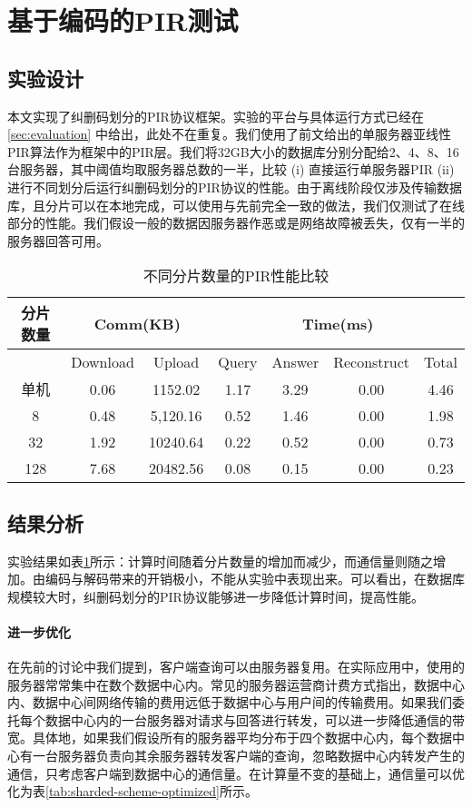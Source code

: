 \section{基于编码的PIR测试}
\subsection{实验设计}
本文实现了纠删码划分的PIR协议框架。实验的平台与具体运行方式已经在 \ref{sec:evaluation} 中给出，此处不在重复。我们使用了前文给出的单服务器亚线性PIR算法作为框架中的PIR层。我们将32GB大小的数据库分别分配给2、4、8、16台服务器，其中阈值均取服务器总数的一半，比较 (i) 直接运行单服务器PIR (ii) 进行不同划分后运行纠删码划分的PIR协议的性能。由于离线阶段仅涉及传输数据库，且分片可以在本地完成，可以使用与先前完全一致的做法，我们仅测试了在线部分的性能。我们假设一般的数据因服务器作恶或是网络故障被丢失，仅有一半的服务器回答可用。

\begin{table}[]
    \caption{不同分片数量的PIR性能比较}
    \label{tab:sharded-scheme}
    \centering
    \begin{tabular}{@{}c|cc|cccc@{}}
    \toprule
    分片数量 & \multicolumn{2}{c|}{Comm(KB)} & \multicolumn{4}{c}{Time(ms)}         \\ \midrule
         & Download      & Upload        & Query & Answer & Reconstruct & Total \\ \midrule
    单机   & 0.06          & 1152.02       & 1.17  & 3.29   & 0.00        & 4.46  \\
    8    & 0.48          & 5,120.16      & 0.52  & 1.46   & 0.00        & 1.98  \\
    32   & 1.92          & 10240.64      & 0.22  & 0.52   & 0.00        & 0.73  \\
    128  & 7.68          & 20482.56      & 0.08  & 0.15   & 0.00        & 0.23  \\ \bottomrule
    \end{tabular}
    \end{table}
\subsection{结果分析}

实验结果如表\ref{tab:sharded-scheme}所示：计算时间随着分片数量的增加而减少，而通信量则随之增加。由编码与解码带来的开销极小，不能从实验中表现出来。可以看出，在数据库规模较大时，纠删码划分的PIR协议能够进一步降低计算时间，提高性能。

\paragraph{进一步优化}
在先前的讨论中我们提到，客户端查询可以由服务器复用。在实际应用中，使用的服务器常常集中在数个数据中心内。常见的服务器运营商计费方式指出，数据中心内、数据中心间网络传输的费用远低于数据中心与用户间的传输费用。如果我们委托每个数据中心内的一台服务器对请求与回答进行转发，可以进一步降低通信的带宽。具体地，如果我们假设所有的服务器平均分布于四个数据中心内，每个数据中心有一台服务器负责向其余服务器转发客户端的查询，忽略数据中心内转发产生的通信，只考虑客户端到数据中心的通信量。在计算量不变的基础上，通信量可以优化为表\ref{tab:sharded-scheme-optimized}所示。


